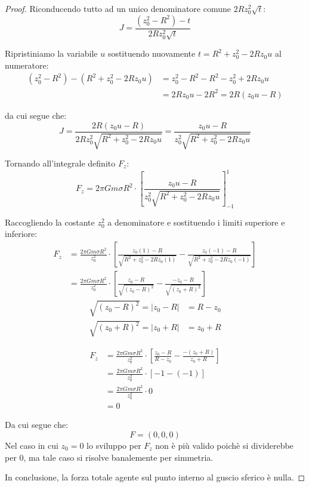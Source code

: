 \documentclass[11pt]{article}
\theoremstyle{plain}
\begin{document}
\begin{proof}
    Riconducendo tutto ad un unico denominatore comune $2Rz_0^2\sqrt{t}$:
    \begin{equation}
        J = \frac{(z_0^2 - R^2) - t}{2Rz_0^2\sqrt{t}}
    \end{equation}

    Ripristiniamo la variabile $u$ sostituendo nuovamente $t = R^2 + z_0^2 - 2Rz_0 u$ al numeratore:
    \begin{align}
        (z_0^2 - R^2) - (R^2 + z_0^2 - 2Rz_0 u) & = z_0^2 - R^2 - R^2 - z_0^2 + 2Rz_0 u \\
                                            & = 2Rz_0 u - 2R^2 = 2R(z_0 u - R)
    \end{align}

    da cui segue che:
    \begin{equation}
        J = \frac{2R(z_0 u - R)}{2Rz_0^2 \sqrt{R^2 + z_0^2 - 2Rz_0 u}} = \frac{z_0 u - R}{z_0^2 \sqrt{R^2 + z_0^2 - 2Rz_0 u}}
    \end{equation}

    Tornando all'integrale definito $F_z$:
    \begin{equation}
        F_z = 2\pi Gm\sigma R^2 \cdot \left[ \frac{z_0 u - R}{z_0^2 \sqrt{R^2 + z_0^2 - 2Rz_0 u}} \right]_{-1}^{1}
    \end{equation}

    Raccogliendo la costante $z_0^2$ a denominatore e sostituendo i limiti superiore e inferiore:
    \begin{align}
        F_z & = \frac{2\pi Gm\sigma R^2}{z_0^2} \cdot \left[ \frac{z_0(1) - R}{\sqrt{R^2 + z_0^2 - 2Rz_0(1)}} - \frac{z_0(-1) - R}{\sqrt{R^2 + z_0^2 - 2Rz_0(-1)}} \right] \\
         & = \frac{2\pi Gm\sigma R^2}{z_0^2} \cdot \left[ \frac{z_0 - R}{\sqrt{(z_0 - R)^2}} - \frac{-z_0 - R}{\sqrt{(z_0 + R)^2}} \right]
    \end{align}
    \begin{align}
        \sqrt{(z_0 - R)^2} = |z_0 - R| & = R - z_0 \\
        \sqrt{(z_0 + R)^2} = |z_0 + R| & = z_0 + R
    \end{align}

    \begin{align}
        F_z & = \frac{2\pi Gm\sigma R^2}{z_0^2} \cdot \left[ \frac{z_0 - R}{R - z_0} - \frac{-(z_0 + R)}{z_0 + R} \right] \\
            & = \frac{2\pi Gm\sigma R^2}{z_0^2} \cdot \left[ -1 - (-1) \right] \\
            & = \frac{2\pi Gm\sigma R^2}{z_0^2} \cdot 0 \\
            & = 0
    \end{align}

    Da cui segue che:
    \begin{equation}
        F = (0, 0, 0)
    \end{equation}
    Nel caso in cui $z_0 = 0$ lo sviluppo per $F_z$ non è più valido poichè si dividerebbe per 0, ma tale caso si risolve banalemente per simmetria.

    In conclusione, la forza totale agente sul punto interno al guscio sferico è nulla.
\end{proof}
\end{document}
